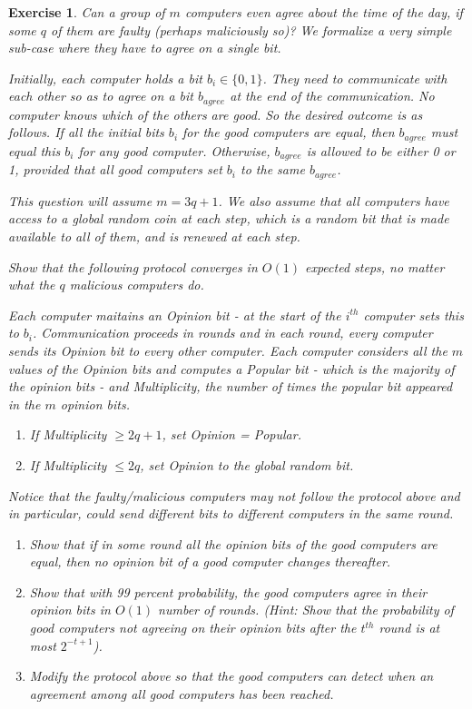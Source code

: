 \documentclass[12pt]{article}
\theoremstyle{colon}
\newtheorem{exercise}{Exercise}
\begin{document}
\begin{exercise}
  Can a group of $m$ computers even agree about the time of the day, if some $q$ of them are faulty (perhaps maliciously so)? We formalize a very simple sub-case where they have to agree on a single bit.

  Initially, each computer holds a bit $b_i \in \{0,1\}$. They need to communicate with each other so as to agree on a bit $b_{agree}$ at the end of the communication. No computer knows which of the others are good. So the desired outcome is as follows. If all the initial bits $b_i$ for the good computers are equal, then $b_{agree}$ must equal this $b_i$ for any good computer. Otherwise, $b_{agree}$ is allowed to be either 0 or 1, provided that all good computers set $b_i$ to the same $b_{agree}$.

  This question will assume $m = 3q + 1$. We also assume that all computers have access to a \textit{global random coin} at each step, which is a random bit that is made available to all of them, and is renewed at each step.

  Show that the following protocol converges in $O(1)$ expected steps, no matter what the $q$ malicious computers do.

  Each computer maitains an \textit{Opinion} bit - at the start of the $i^{th}$ computer sets this to $b_i$. Communication proceeds in rounds and in each round, every computer sends its \textit{Opinion} bit to every other computer. Each computer considers all the $m$ values of the \textit{Opinion} bits and computes a \textit{Popular} bit - which is the majority of the \textit{opinion} bits - and \textit{Multiplicity}, the number of times the popular bit appeared in the $m$ \textit{opinion} bits.

  \begin{enumerate}[label=\arabic*)]
    \item If \textit{Multiplicity} $\geq 2q + 1$, set \textit{Opinion} = \textit{Popular}.
    \item If \textit{Multiplicity} $\leq 2q$, set \textit{Opinion} to the global random bit.
  \end{enumerate}

  Notice that the faulty/malicious computers may not follow the protocol above and in particular, could send different bits to different computers in the same round.

  \begin{enumerate}[label=\arabic*)]
    \item Show that if in some round all the opinion bits of the good computers are equal, then no opinion bit of a good computer changes thereafter.
    \item Show that with 99 percent probability, the good computers agree in their opinion bits in $O(1)$ number of rounds. (Hint: Show that the probability of good computers not agreeing on their opinion bits after the $t^{th}$ round is at most $2^{-t+1}$).
    \item Modify the protocol above so that the good computers can detect \textit{when} an agreement among all good computers has been reached.
  \end{enumerate}
\end{exercise}
\end{document}
